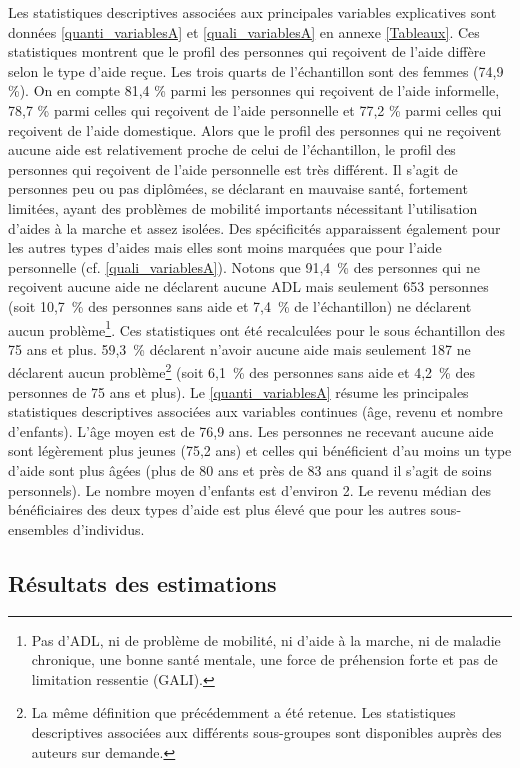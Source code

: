 \begin{Article}
\begin{refsection}[Bonnal]
Les statistiques descriptives associées aux principales variables explicatives sont données \autoref{quanti_variablesA} et \autoref{quali_variablesA} en annexe \ref{Tableaux}. Ces statistiques montrent que le profil des personnes qui reçoivent de l'aide diffère selon le type d'aide reçue. Les trois quarts de l'échantillon sont des femmes (74,9 \%). On en compte 81,4 \% parmi les personnes qui reçoivent de l’aide informelle, 78,7 \% parmi celles qui reçoivent de l'aide personnelle et 77,2 \% parmi celles qui reçoivent de l'aide domestique. Alors que le profil des personnes qui ne reçoivent aucune aide est relativement proche de celui de l'échantillon, le profil des personnes qui reçoivent de l'aide personnelle est très différent. Il s'agit de personnes peu ou pas diplômées, se déclarant en mauvaise santé, fortement limitées, ayant des problèmes de mobilité importants nécessitant l'utilisation d'aides à la marche et assez isolées. Des spécificités apparaissent également pour les autres types d'aides mais elles sont moins marquées que pour l'aide personnelle (cf. \autoref{quali_variablesA}). Notons que 91,4~\% des personnes qui ne reçoivent aucune aide ne déclarent aucune ADL mais seulement 653 personnes (soit 10,7~\% des personnes sans aide et 7,4~\% de l’échantillon) ne déclarent aucun problème\footnote{Pas d'ADL, ni de problème de mobilité, ni d'aide à la marche, ni de maladie chronique, une bonne santé mentale, une force de préhension forte et pas de limitation ressentie (GALI).}. Ces statistiques ont été recalculées pour le sous échantillon des 75 ans et plus. 59,3~\% déclarent n'avoir aucune aide mais seulement 187 ne déclarent aucun problème\footnote{La même définition que précédemment a été retenue. Les statistiques descriptives associées aux différents sous-groupes sont disponibles auprès des auteurs sur demande.} (soit 6,1~\% des personnes sans aide et 4,2~\% des personnes de 75 ans et plus). Le \autoref{quanti_variablesA} résume les principales statistiques descriptives associées aux variables continues (âge, revenu et nombre d'enfants). L'âge moyen est de 76,9 ans. Les personnes ne recevant aucune aide sont légèrement plus jeunes (75,2 ans) et celles qui bénéficient d'au moins un type d'aide sont plus âgées (plus de 80 ans et près de 83 ans quand il s'agit de soins personnels). Le nombre moyen d'enfants est d'environ 2. Le revenu médian des bénéficiaires des deux types d'aide est plus élevé que pour les autres sous-ensembles d'individus.


\subsection{Résultats des estimations}


\end{refsection}
\end{Article}
